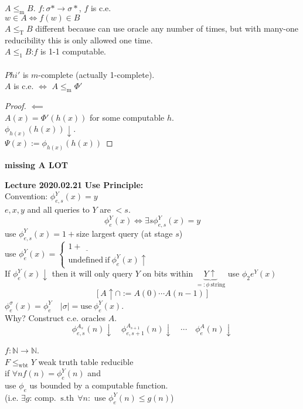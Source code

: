 \documentclass{article}
\let\ddd\cdots
\newcommand{\sth}{\ \mathrm{s.th}\ }
\newcommand{\N}{\mathbb{N}}
\newcommand{\abs}[1]{\left|#1\right|}
\newcommand{\tr}{\leq_\mathrm{T}}
\newcommand{\halts}{\downarrow}
\newcommand{\mor}{\leq_\mathrm{m}}
\newcommand{\oor}{\leq_\mathrm{1}}
\theoremstyle{definition}
\theoremstyle{remark}
\theoremstyle{example}
\begin{document}
 	$A \mor B$. $f:\sigma* \to \sigma*$, $f$ is c.e.\\
 	$w \in A \iff f(w) \in B$\\
 	$A \tr B$ different because can use oracle any number of times, but with many-one reducibility this is only allowed one time.\\
 	$A \oor B$:$f$ is 1-1 computable.\\
 	\\
 	$Phi'$ is $m$-complete (actually 1-complete).\\
 	$A$ is c.e. $\iff$ $A \mor \Phi'$\\
 	\begin{proof}
 		$\impliedby$\\
 		$A(x)=\Phi'(h(x))$ for some computable $h$.\\
 		$\phi_{h(x)}(h(x)) \halts$.\\
 		$\Psi(x):=\phi_{h(x)}(h(x))$
 	\end{proof}
 	
 	\textbf{missing A LOT}
 	
 	\textbf{Lecture 2020.02.21}
 	\textbf{Use Principle:}\\
 	Convention: $\phi^Y_{e,s}(x) = y$\\
 	$e,x,y$ and all queries to $Y$ are $< s$.\\
 	\[\phi_e^Y(x) \iff \exists s \phi_{e,s}^Y(x)=y \]
 	use $\phi_{e,s}^Y(x)=1+$size largest query (at stage $s$)\\
 	use $\phi_e^Y(x)=\begin{cases}
 		1+\underline{\ \ \ \ \ }\\
 		\mathrm{undefined\ if\ } \phi_e^Y(x) \uparrow
 	\end{cases}$\\
 	If $\phi_e^Y(x) \halts$ then it will only query $Y$ on bits within $\underbrace{Y\uparrow}_{=:\phi\ \mathrm{string}}$ use $\phi_2e^Y(x)$\\
 	\[[A\uparrow \cap :=A(0) \ddd A(n-1)]\] 	
 	$\phi_e^\sigma(x)=\phi_e^{Y}\quad \abs{\sigma}=\mathrm{use}\ \phi_e^Y(x)$.\\
 	Why? Construct c.e. oracles $A$.\\
 	\[\phi_{e,s}^{A_s}(n)\halts\quad \phi_{e,s+1}^{A_{s+1}}(n)\halts \quad \ddd \quad \phi_{e}^{A}(n)\halts\]
 	
 	$f:\N \to \N$. \\
 	$F \leq_\mathrm{wbt} Y$ weak truth table reducible\\
 	if $\forall n f(n)=\phi_e^Y(n)$ and\\
 	use $\phi_e$ us bounded by a computable function.\\
 	(i.e. $\exists g$: comp. $\sth\ \forall n:$ use $\phi_e^Y(n) \leq g(n)$)\\
 	\\
\end{document}
